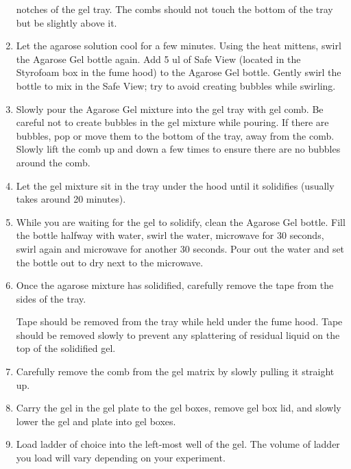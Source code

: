 \documentclass[
  letterpaper,
  DIV=11,
  numbers=noendperiod]{scrreprt}
\begin{document}
\begin{enumerate}
  notches of the gel tray. The combs should not touch the bottom of the
  tray but be slightly above it.
\item
  Let the agarose solution cool for a few minutes. Using the heat
  mittens, swirl the Agarose Gel bottle again. Add 5 ul of Safe View
  (located in the Styrofoam box in the fume hood) to the Agarose Gel
  bottle. Gently swirl the bottle to mix in the Safe View; try to avoid
  creating bubbles while swirling.
\item
  Slowly pour the Agarose Gel mixture into the gel tray with gel comb.
  Be careful not to create bubbles in the gel mixture while pouring. If
  there are bubbles, pop or move them to the bottom of the tray, away
  from the comb. Slowly lift the comb up and down a few times to ensure
  there are no bubbles around the comb.
\item
  Let the gel mixture sit in the tray under the hood until it solidifies
  (usually takes around 20 minutes).
\item
  While you are waiting for the gel to solidify, clean the Agarose Gel
  bottle. Fill the bottle halfway with water, swirl the water, microwave
  for 30 seconds, swirl again and microwave for another 30 seconds. Pour
  out the water and set the bottle out to dry next to the microwave.
\item
  Once the agarose mixture has solidified, carefully remove the tape
  from the sides of the tray.

  \begin{tcolorbox}[enhanced jigsaw, toprule=.15mm, breakable, coltitle=black, leftrule=.75mm, title=\textcolor{quarto-callout-important-color}{\faExclamation}\hspace{0.5em}{This is important}, bottomrule=.15mm, toptitle=1mm, bottomtitle=1mm, colframe=quarto-callout-important-color-frame, opacityback=0, colback=white, opacitybacktitle=0.6, colbacktitle=quarto-callout-important-color!10!white, rightrule=.15mm, titlerule=0mm, arc=.35mm, left=2mm]

  Tape should be removed from the tray while held under the fume hood.
  Tape should be removed slowly to prevent any splattering of residual
  liquid on the top of the solidified gel.

  \end{tcolorbox}
\item
  Carefully remove the comb from the gel matrix by slowly pulling it
  straight up.
\item
  Carry the gel in the gel plate to the gel boxes, remove gel box lid,
  and slowly lower the gel and plate into gel boxes.
\item
  Load ladder of choice into the left-most well of the gel. The volume
  of ladder you load will vary depending on your experiment.


\end{enumerate}
\end{document}
